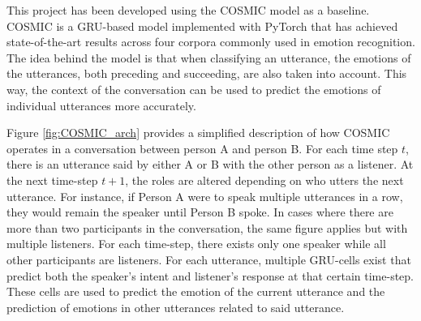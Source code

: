 \documentclass[nofilelist]{cslthse-msc}
\begin{document}
This project has been developed using the COSMIC model \citep{ghosal2020cosmic} as a baseline. COSMIC is a GRU-based model implemented with PyTorch that has achieved state-of-the-art results across four corpora commonly used in emotion recognition. The idea behind the model is that when classifying an utterance, the emotions of the utterances, both preceding and succeeding, are also taken into account. This way, the context of the conversation can be used to predict the emotions of individual utterances more accurately. 




Figure \ref{fig:COSMIC_arch} provides a simplified description of how COSMIC operates in a conversation between person A and person B. For each time step $t$, there is an utterance said by either A or B with the other person as a listener. At the next time-step $t+1$, the roles are altered depending on who utters the next utterance. For instance, if Person A were to speak multiple utterances in a row, they would remain the speaker until Person B spoke. In cases where there are more than two participants in the conversation, the same figure applies but with multiple listeners. For each time-step, there exists only one speaker while all other participants are listeners. For each utterance, multiple GRU-cells exist that predict both the speaker's intent and listener's response at that certain time-step. These cells are used to predict the emotion of the current utterance and the prediction of emotions in other utterances related to said utterance. 
\end{document}
